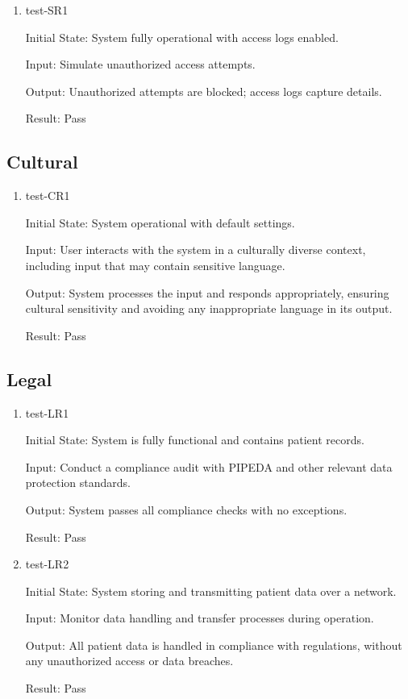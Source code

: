 \documentclass[12pt, titlepage]{article}
\begin{document}
\begin{enumerate}
\item test-SR1 \label{test-SR1}

Initial State: System fully operational with access logs enabled.

Input: Simulate unauthorized access attempts.

Output: Unauthorized attempts are blocked; access logs capture details.

Result: Pass

\end{enumerate}

\subsection{Cultural} \label{section:4.7}

\begin{enumerate}
\item test-CR1 \label{test-CR1} 

Initial State: System operational with default settings.

Input: User interacts with the system in a culturally diverse context, including input that may contain sensitive language.

Output: System processes the input and responds appropriately, ensuring cultural sensitivity and avoiding any inappropriate language in its output.

Result: Pass

\end{enumerate}

\subsection{Legal} \label{section:4.8}

\begin{enumerate}
\item test-LR1 \label{test-LR1}

Initial State: System is fully functional and contains patient records.

Input: Conduct a compliance audit with PIPEDA and other relevant data protection standards.

Output: System passes all compliance checks with no exceptions.

Result: Pass

\item test-LR2 \label{test-LR2}

Initial State: System storing and transmitting patient data over a network.

Input: Monitor data handling and transfer processes during operation.

Output: All patient data is handled in compliance with regulations, without any unauthorized access or data breaches.

Result: Pass

\end{enumerate}
\end{document}
